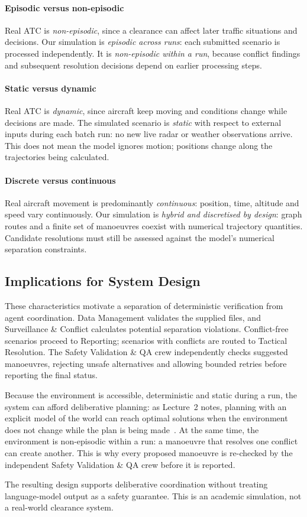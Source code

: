 \paragraph{Episodic versus non-episodic}
Real ATC is \emph{non-episodic}, since a clearance can affect later traffic
situations and decisions. Our simulation is \emph{episodic across runs}:
each submitted scenario is processed independently. It is
\emph{non-episodic within a run}, because conflict findings and subsequent
resolution decisions depend on earlier processing steps.

\paragraph{Static versus dynamic}
Real ATC is \emph{dynamic}, since aircraft keep moving and conditions
change while decisions are made. The simulated scenario is \emph{static}
with respect to external inputs during each batch run: no new live radar
or weather observations arrive. This does not mean the model ignores
motion; positions change along the trajectories being calculated.

\paragraph{Discrete versus continuous}
Real aircraft movement is predominantly \emph{continuous}: position,
time, altitude and speed vary continuously. Our simulation is
\emph{hybrid and discretised by design}: graph routes and a finite set of manoeuvres coexist with numerical trajectory
quantities. Candidate resolutions must still be assessed against the
model's numerical separation constraints.

\subsection{Implications for System Design}

These characteristics motivate a separation of deterministic verification
from agent coordination. Data Management validates the supplied files,
and Surveillance \& Conflict calculates potential separation violations.
Conflict-free scenarios proceed to Reporting; scenarios with conflicts
are routed to Tactical Resolution. The Safety Validation \& QA crew
independently checks suggested manoeuvres, rejecting unsafe alternatives
and allowing bounded retries before reporting the final status.

Because the environment is accessible, deterministic and static during
a run, the system can afford deliberative planning: as Lecture~2 notes,
planning with an explicit model of the world can reach optimal solutions
when the environment does not change while the plan is being
made~\cite{urvlect2}. At the same time, the environment is non-episodic
within a run: a manoeuvre that resolves one conflict can create another.
This is why every proposed manoeuvre is re-checked by the independent
Safety Validation \& QA crew before it is reported.

The resulting design supports deliberative coordination without treating
language-model output as a safety guarantee. This is an academic
simulation, not a real-world clearance system.


